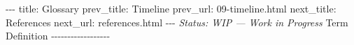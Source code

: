 \documentclass[12pt,a4paper]{article}
\begin{document}
-\/-\/- title: Glossary prev\_title: Timeline prev\_url:
09-timeline.html next\_title: References next\_url: references.html
-\/-\/- \emph{Status: WIP --- Work in Progress} \textbar{} Term
\textbar{} Definition \textbar{}
\textbar-\/-\/-\/-\/-\/-\textbar-\/-\/-\/-\/-\/-\/-\/-\/-\/-\/-\/-\textbar{}
\textbar{} \textbar{} \textbar{}
\end{document}
